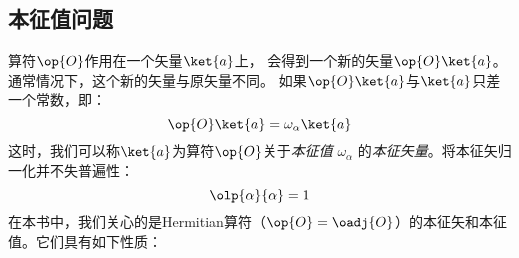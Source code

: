 

\subsection{本征值问题}
\label{sec:1.1.6}
算符$\op{O}$作用在一个矢量$\ket{a}$上，
会得到一个新的矢量$\op{O}\ket{a}$。
通常情况下，这个新的矢量与原矢量不同。
如果$\op{O}\ket{a}$与$\ket{a}$只差一个常数，即：
\begin{equation}
 \op{O}\ket{a} = \omega_{\alpha}\ket{a}
 \label{eq:1.72}
\end{equation}
这时，我们可以称$\ket{a}$为算符$\op{O}$关于\emph{本征值} $\omega_{\alpha}$ 的\emph{本征矢量}。将本征矢归一化并不失普遍性：
\begin{equation}
 \olp{\alpha}{\alpha} = 1
 \label{eq:1.73}
\end{equation}
在本书中，我们关心的是Hermitian算符（$\op{O}=\oadj{O}$）的本征矢和本征值。它们具有如下性质：
